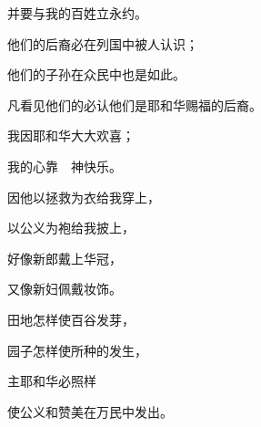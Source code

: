 {\par }{\Q 并要与我的百姓立永约。
\par }{\Q {}他们的后裔必在列国中被人认识；
\par }{\Q 他们的子孙在众民中也是如此。
\par }{\Q 凡看见他们的必认他们是耶和华赐福的后裔。
\par }{\BB \par }{\Q {}我因耶和华大大欢喜；
\par }{\Q 我的心靠　神快乐。
\par }{\Q 因他以拯救为衣给我穿上，
\par }{\Q 以公义为袍给我披上，
\par }{\Q 好像新郎戴上华冠，
\par }{\Q 又像新妇佩戴妆饰。
\par }{\Q {}田地怎样使百谷发芽，
\par }{\Q 园子怎样使所种的发生，
\par }{\Q 主耶和华必照样
\par }{\Q 使公义和赞美在万民中发出。

}

